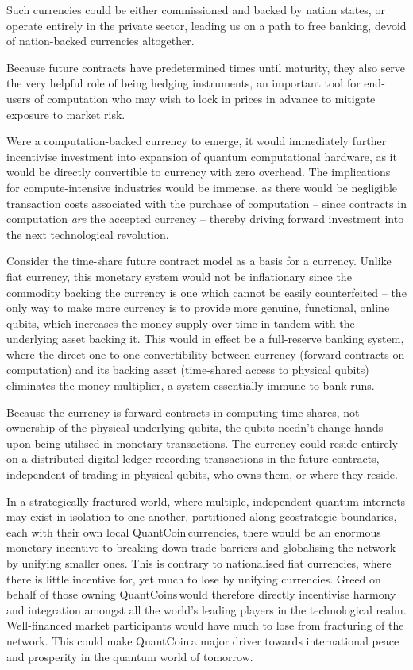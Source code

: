 Such currencies could be either commissioned and backed by nation states, or operate entirely in the private sector, leading us on a path to free banking, devoid of nation-backed currencies altogether.

Because future contracts have predetermined times until maturity, they also serve the very helpful role of being hedging instruments, an important tool for end-users of computation who may wish to lock in prices in advance to mitigate exposure to market risk.

Were a computation-backed currency to emerge, it would immediately further incentivise investment into expansion of quantum computational hardware, as it would be directly convertible to currency with zero overhead. The implications for compute-intensive industries would be immense, as there would be negligible transaction costs associated with the purchase of computation -- since contracts in computation \textit{are} the accepted currency -- thereby driving forward investment into the next technological revolution.

Consider the time-share future contract model as a basis for a currency. Unlike fiat currency, this monetary system would not be inflationary since the commodity backing the currency is one which cannot be easily counterfeited -- the only way to make more currency is to provide more genuine, functional, online qubits, which increases the money supply over time in tandem with the underlying asset backing it. This would in effect be a full-reserve banking system, where the direct one-to-one convertibility between currency (forward contracts on computation) and its backing asset (time-shared access to physical qubits) eliminates the money multiplier, a system essentially immune to bank runs.

Because the currency is forward contracts in computing time-shares, not ownership of the physical underlying qubits, the qubits needn't change hands upon being utilised in monetary transactions. The currency could reside entirely on a distributed digital ledger recording transactions in the future contracts, independent of trading in physical qubits, who owns them, or where they reside.

In a strategically fractured world, where multiple, independent quantum internets may exist in isolation to one another, partitioned along geostrategic boundaries, each with their own local QuantCoin\texttrademark\,currencies, there would be an enormous monetary incentive to breaking down trade barriers and globalising the network by unifying smaller ones. This is contrary to nationalised fiat currencies, where there is little incentive for, yet much to lose by unifying currencies. Greed on behalf of those owning QuantCoins\texttrademark\,would therefore directly incentivise harmony and integration amongst all the world's leading players in the technological realm. Well-financed market participants would have much to lose from fracturing of the network. This could make QuantCoin\texttrademark\,a major driver towards international peace and prosperity in the quantum world of tomorrow.

